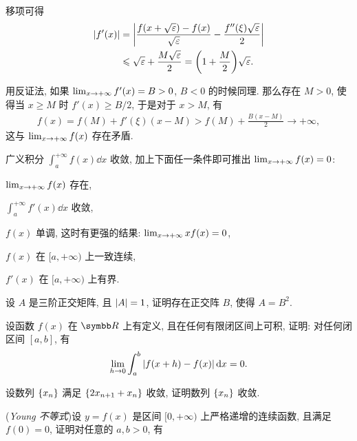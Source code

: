 \begin{exercise}[series=exer]
\begin{answer}
\begin{answersheet}
\begin{align*}
            \end{align*}
            移项可得 
            \begin{align*}
                \abs{f'(x)} & = \abs{\frac{f\qty(x + \sqrt{\varepsilon}) - f(x)}{\sqrt{\varepsilon}} - \frac{f''(\xi)\sqrt{\varepsilon}}{2}}\\
                & \leqslant \sqrt{\varepsilon} + \frac{M\sqrt{\varepsilon}}{2} = \qty(1 + \frac{M}{2})\sqrt{\varepsilon}.
            \end{align*}
            \item 用反证法, 如果 $ \lim_{x \to +\infty} f'(x) = B > 0 $, $ B < 0 $ 的时候同理. 那么存在 $ M > 0 $, 使得当 $ x \ge M $ 时 $ f'(x) \ge B/2 $, 于是对于 $ x > M $, 有
            \begin{align*}
                f(x) = f(M) + f'(\xi)(x - M) > f(M) + \frac{B(x - M)}{2} \to +\infty,
            \end{align*}
            这与 $ \lim_{x \to +\infty}f(x) $ 存在矛盾. 
        \end{answersheet}
    \end{answer}
    \item 广义积分 $ \int_{a}^{+\infty} f(x) \dd{x} $ 收敛, 加上下面任一条件即可推出 $ \lim_{x \to +\infty} f(x) = 0 $:
    \begin{exercise}
        \item $ \lim_{x \to +\infty} f(x) $ 存在,
        \item $ \int_{a}^{+\infty} f'(x) \dd{x} $ 收敛,
        \item $ f(x) $ 单调, 这时有更强的结果: $ \lim_{x \to +\infty} xf(x) = 0 $,
        \item $ f(x) $ 在 $ [a, +\infty) $ 上一致连续,
        \item $ f'(x) $ 在 $ [a, +\infty) $ 上有界. 
    \end{exercise}
    \item 设 $ A $ 是三阶正交矩阵, 且 $ \abs{A} = 1 $, 证明存在正交阵 $ B $, 使得 $ A = B^{2} $.  
    \item 设函数 $ f(x) $ 在 $ \R $ 上有定义, 且在任何有限闭区间上可积, 证明: 对任何闭区间 $ [a, b] $, 有
    \begin{align*}
        \lim_{h \to 0} \int_{a}^{b} \abs{f(x + h) - f(x)} \dd{x} = 0.
    \end{align*}
    \item 设数列 $ \qty{x_{n}} $ 满足 $ \qty{2x_{n+1} + x_{n}} $ 收敛, 证明数列 $ \qty{x_{n}} $ 收敛. 
    \item (\emph{Young 不等式})设 $ y=f(x) $ 是区间 $ [0, +\infty) $ 上严格递增的连续函数, 且满足 $ f(0) = 0 $, 证明对任意的 $ a, b > 0 $, 有

\end{exercise}
